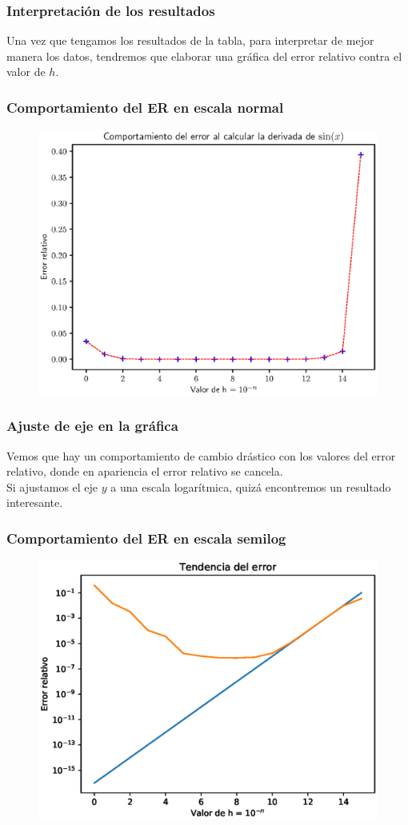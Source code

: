 \documentclass[12pt]{beamer}
\begin{document}
\begin{frame}[fragile]
\frametitle{Interpretación de los resultados}
Una vez que tengamos los resultados de la tabla, para interpretar de mejor manera los datos, tendremos que elaborar una gráfica del error relativo contra el valor de $h$.
\end{frame}
\begin{frame}
\frametitle{Comportamiento del ER en escala normal}
\begin{figure}
    \centering
    \includegraphics[scale=0.6]{Imagenes/Ejercicio_Derivada_00.eps}
\end{figure}
\end{frame}
\begin{frame}[fragile]
\frametitle{Ajuste de eje en la gráfica}
Vemos que hay un comportamiento de cambio drástico con los valores del error relativo, donde en apariencia el error relativo se cancela.
\\
\bigskip
\pause
Si ajustamos el eje $y$ a una escala logarítmica, quizá encontremos un resultado interesante.
\end{frame}
\begin{frame}
\frametitle{Comportamiento del ER en escala semilog}
\begin{figure}
	\centering
    \includegraphics[scale=0.55]{Imagenes/Ejercicio_Derivada_01.eps}
\end{figure}
\end{frame}
\end{document}
